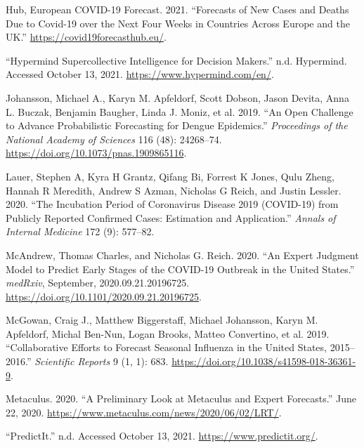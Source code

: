 \documentclass[
]{article}
\newlength{\cslhangindent}
\newlength{\cslentryspacingunit} %
\newenvironment{CSLReferences}[2] %
 {%
  \setlength{\parindent}{0pt}
  \ifodd #1
  \let\oldpar\par
  \def\par{\hangindent=\cslhangindent\oldpar}
  \fi
  \setlength{\parskip}{#2\cslentryspacingunit}
 }%
 {}
\begin{document}
\begin{CSLReferences}{1}{0}
\leavevmode{}%
Hub, European COVID-19 Forecast. 2021. {``Forecasts of New Cases and Deaths Due to Covid-19 over the Next Four Weeks in Countries Across Europe and the UK.''} \url{https://covid19forecasthub.eu/}.

\leavevmode{}%
{``Hypermind \textbar{} {Supercollective} Intelligence for Decision Makers.''} n.d. {Hypermind}. Accessed October 13, 2021. \url{https://www.hypermind.com/en/}.

\leavevmode{}%
Johansson, Michael A., Karyn M. Apfeldorf, Scott Dobson, Jason Devita, Anna L. Buczak, Benjamin Baugher, Linda J. Moniz, et al. 2019. {``An Open Challenge to Advance Probabilistic Forecasting for Dengue Epidemics.''} \emph{Proceedings of the National Academy of Sciences} 116 (48): 24268--74. \url{https://doi.org/10.1073/pnas.1909865116}.

\leavevmode{}%
Lauer, Stephen A, Kyra H Grantz, Qifang Bi, Forrest K Jones, Qulu Zheng, Hannah R Meredith, Andrew S Azman, Nicholas G Reich, and Justin Lessler. 2020. {``The Incubation Period of Coronavirus Disease 2019 (COVID-19) from Publicly Reported Confirmed Cases: Estimation and Application.''} \emph{Annals of Internal Medicine} 172 (9): 577--82.

\leavevmode{}%
McAndrew, Thomas Charles, and Nicholas G. Reich. 2020. {``An Expert Judgment Model to Predict Early Stages of the {COVID}-19 Outbreak in the {United States}.''} \emph{medRxiv}, September, 2020.09.21.20196725. \url{https://doi.org/10.1101/2020.09.21.20196725}.

\leavevmode{}%
McGowan, Craig J., Matthew Biggerstaff, Michael Johansson, Karyn M. Apfeldorf, Michal Ben-Nun, Logan Brooks, Matteo Convertino, et al. 2019. {``Collaborative Efforts to Forecast Seasonal Influenza in the {United States}, 2015--2016.''} \emph{Scientific Reports} 9 (1, 1): 683. \url{https://doi.org/10.1038/s41598-018-36361-9}.

\leavevmode{}%
Metaculus. 2020. {``A {Preliminary Look} at {Metaculus} and {Expert Forecasts}.''} June 22, 2020. \url{https://www.metaculus.com/news/2020/06/02/LRT/}.

\leavevmode{}%
{``{PredictIt}.''} n.d. Accessed October 13, 2021. \url{https://www.predictit.org/}.


\end{CSLReferences}
\end{document}

